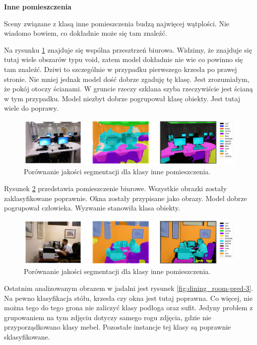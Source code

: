 \noindent
\textbf{Inne pomieszczenia}

Sceny związane z klasą inne pomieszczenia budzą najwięcej wątplości. Nie wiadomo bowiem, co dokładnie może się tam znaleźć.

Na rysunku \ref{fig:other_indoor-pred-1} znajduje się wspólna przesztrzeń biurowa. Widzimy, że znajduje się tutaj wiele obszarów typu void, zatem model dokładnie nie wie co powinno się tam znaleźć. Dziwi to szczególnie w przypadku pierwszego krzesła po prawej stronie. Nie mniej jednak model dość dobrze zgaduję tę klasę. Jest zrozumiałym, że pokój otoczy ścianami. W gruncie rzeczy szklana szyba rzeczywiście jest ścianą w tym przypadku. Model niezbyt dobrze pogrupował klasę obiekty. Jest tutaj wiele do poprawy.

\begin{figure}[ht!]
    \centering
    \includegraphics[width=\textwidth]{img/preds_analysis/gt_vs_pred/other_indoor-1.png}
    \caption{Porównanie jakości segmentacji dla klasy inne pomieszczenia.}
    \label{fig:other_indoor-pred-1}
\end{figure}

Rysunek \ref{fig:other_indoor-pred-2} przedstawia pomieszczenie biurowe. Wszystkie obrazki zostały zaklasyfikowane poprawnie. Okna zostały przypisane jako obrazy. Model dobrze pogrupował człowieka. Wyzwanie stanowiła klasa obiekty.

\begin{figure}[ht!]
    \centering
    \includegraphics[width=\textwidth]{img/preds_analysis/gt_vs_pred/other_indoor-2.png}
    \caption{Porównanie jakości segmentacji dla klasy inne pomieszczenia.}
    \label{fig:other_indoor-pred-2}
\end{figure}


Ostatnim analizowanym obrazem w jadalni jest rysunek \ref{fig:dining_room-pred-3}. Na pewno klasyfikacja stółu, krzesła czy okna jest tutaj poprawna. Co więcej, nie można tego do tego grona nie zaliczyć klasy podłoga oraz sufit. Jedyny problem z grupowaniem na tym zdjęciu dotyczy samego rogu zdjęcia, gdzie nie przyporządkowano klasy mebel. Pozostałe instancje tej klasy są poprawnie sklasyfikowane.

